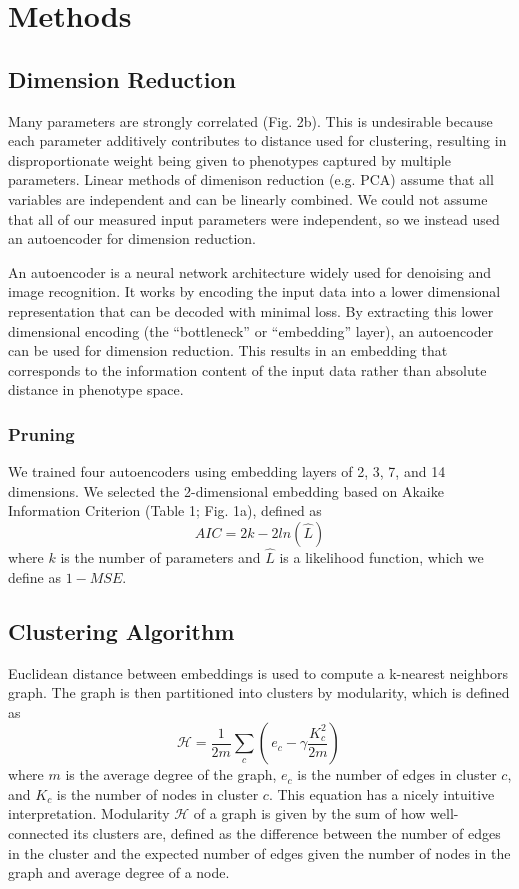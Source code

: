\documentclass{article}
\begin{document}
\section{Methods}

\subsection{Dimension Reduction}

Many parameters are strongly correlated (Fig. 2b). This is undesirable because each parameter additively contributes to distance used for clustering, resulting in disproportionate weight being given to phenotypes captured by multiple parameters. Linear methods of dimenison reduction (e.g. PCA) assume that all variables are independent and can be linearly combined. We could not assume that all of our measured input parameters were independent, so we instead used an autoencoder for dimension reduction.

An autoencoder is a neural network architecture widely used for denoising and image recognition. It works by encoding the input data into a lower dimensional representation that can be decoded with minimal loss. By extracting this lower dimensional encoding (the ``bottleneck'' or ``embedding'' layer), an autoencoder can be used for dimension reduction\cite{WANG2016232}. This results in an embedding that corresponds to the information content of the input data rather than absolute distance in phenotype space.

\subsubsection{Pruning}

We trained four autoencoders using embedding layers of 2, 3, 7, and 14 dimensions. We selected the 2-dimensional embedding based on Akaike Information Criterion\cite{cavanaugh2019akaike} (Table 1; Fig. 1a), defined as 
\begin{equation}
AIC = 2k - 2ln(\hat{L}) 
\end{equation}
where $k$ is the number of parameters and $\hat{L}$ is a likelihood function, which we define as $1 - MSE$.

\subsection{Clustering Algorithm}
Euclidean distance between embeddings is used to compute a k-nearest neighbors graph. The graph is then partitioned into clusters by modularity\cite{PhysRevE.74.016110}, which is defined as 
\begin{equation}
 \mathcal{H} = \frac{1}{2m}\sum_{c}( \,e_c - \gamma\frac{K_c^2}{2m}) \, 
\end{equation}
 where $m$ is the average degree of the graph, $e_c$ is the number of edges in cluster $c$, and $K_c$ is the number of nodes in cluster $c$. This equation has a nicely intuitive interpretation. Modularity $\mathcal{H}$ of a graph is given by the sum of how well-connected its clusters are, defined as the difference between the number of edges in the cluster and the expected number of edges given the number of nodes in the graph and average degree of a node.
\end{document}
